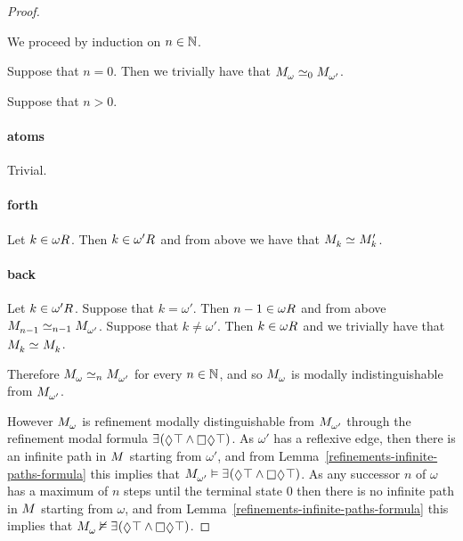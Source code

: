 \begin{proof}
\begin{enumerate}
        We proceed by induction on $n \in \mathbb{N}$.

        Suppose that $n = 0$. Then we trivially have that $\kPModel{\omega} \bisimilar[0] \kPModel{\omega'}$.

        Suppose that $n > 0$.

        \paragraph{atoms} Trivial.

        \paragraph{forth} Let $k \in \kSuccessors{}{\omega}$. Then $k \in \kSuccessors{}{\omega'}$ and from above we have that $\kPModel{k} \bisimilar \kPModelP{k}$.

        \paragraph{back} Let $k \in \kSuccessors{}{\omega'}$.
        Suppose that $k = \omega'$. Then $n - 1 \in \kSuccessors{}{\omega}$ and from above $\kPModel{n - 1} \bisimilar[n - 1] \kPModel{\omega'}$.
        Suppose that $k \neq \omega'$. Then $k \in \kSuccessors{}{\omega}$ and we trivially have that $\kPModel{k} \bisimilar \kPModel{k}$.
\end{enumerate}

Therefore $\kPModel{\omega} \bisimilar[n] \kPModel{\omega'}$ for every $n \in \mathbb{N}$, and so $\kPModel{\omega}$ is modally indistinguishable from $\kPModel{\omega'}$.

However $\kPModel{\omega}$ is refinement modally distinguishable from $\kPModel{\omega'}$ 
through the refinement modal formula $\somerefs (\possible \top \land \necessary \possible \top)$. 
As $\omega'$ has a reflexive edge, 
then there is an infinite path in $\kModel$ starting from $\omega'$, 
and from Lemma~\ref{refinements-infinite-paths-formula} this implies that 
$\kPModel{\omega'} \entails \somerefs (\possible \top \land \necessary \possible \top)$.
As any successor $n$ of $\omega$ has a maximum of $n$ steps until the terminal state $0$
then there is no infinite path in $\kModel$ starting from $\omega$,
and from Lemma~\ref{refinements-infinite-paths-formula} this implies that 
$\kPModel{\omega} \nentails \somerefs (\possible \top \land \necessary \possible \top)$.
\end{proof}

